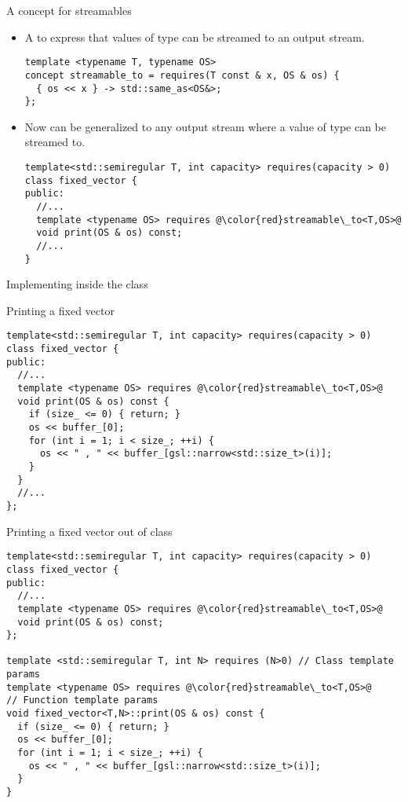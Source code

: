 \begin{frame}[t,fragile]{A concept for streamables}
\begin{itemize}
  \item A  to express that values of type  can be streamed
        to an output stream.
\begin{lstlisting}
template <typename T, typename OS>
concept streamable_to = requires(T const & x, OS & os) {
  { os << x } -> std::same_as<OS&>;
};
\end{lstlisting}

  \item Now  can be generalized to any output stream where a value of type  can be 
        streamed to.
\begin{lstlisting}[escapechar=@]
template<std::semiregular T, int capacity> requires(capacity > 0)
class fixed_vector {
public:
  //...
  template <typename OS> requires @\color{red}streamable\_to<T,OS>@
  void print(OS & os) const;
  //...
}
\end{lstlisting}
\end{itemize}
\end{frame}

\begin{frame}[t,fragile]{Implementing inside the class}
\begin{block}{Printing a fixed vector}
\begin{lstlisting}[escapechar=@]
template<std::semiregular T, int capacity> requires(capacity > 0)
class fixed_vector {
public:
  //...
  template <typename OS> requires @\color{red}streamable\_to<T,OS>@
  void print(OS & os) const {
    if (size_ <= 0) { return; }
    os << buffer_[0];
    for (int i = 1; i < size_; ++i) {
      os << " , " << buffer_[gsl::narrow<std::size_t>(i)];
    }
  }
  //...
};
\end{lstlisting}
\end{block}
\end{frame}

\begin{frame}[t,fragile]
\begin{block}{Printing a fixed vector out of class}
\begin{lstlisting}[escapechar=@]
template<std::semiregular T, int capacity> requires(capacity > 0)
class fixed_vector {
public:
  //...
  template <typename OS> requires @\color{red}streamable\_to<T,OS>@
  void print(OS & os) const;
};

template <std::semiregular T, int N> requires (N>0) // Class template params
template <typename OS> requires @\color{red}streamable\_to<T,OS>@    // Function template params
void fixed_vector<T,N>::print(OS & os) const {
  if (size_ <= 0) { return; }
  os << buffer_[0];
  for (int i = 1; i < size_; ++i) {
    os << " , " << buffer_[gsl::narrow<std::size_t>(i)];
  }
}
\end{lstlisting}

\end{block}
\end{frame}
